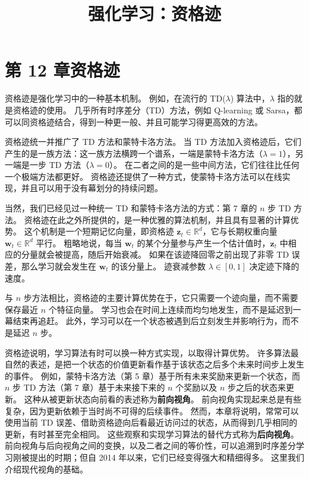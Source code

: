 \documentclass[UTF8,12pt,a4paper,fontset=fandol]{ctexart}
\title{强化学习：资格迹}
\author{}
\date{}
\begin{document}
\maketitle

\section*{第 12 章\quad 资格迹}

资格迹是强化学习中的一种基本机制。
例如，在流行的 TD($\lambda$) 算法中，$\lambda$ 指的就是资格迹的使用。
几乎所有时序差分（TD）方法，例如 Q-learning 或 Sarsa，都可以同资格迹结合，得到一种更一般、并且可能学习得更高效的方法。

资格迹统一并推广了 TD 方法和蒙特卡洛方法。
当 TD 方法加入资格迹后，它们产生的是一族方法：这一族方法横跨一个谱系，一端是蒙特卡洛方法（$\lambda=1$），另一端是一步 TD 方法（$\lambda=0$）。
在二者之间的是一些中间方法，它们往往比任何一个极端方法都更好。
资格迹还提供了一种方式，使蒙特卡洛方法可以在线实现，并且可以用于没有幕划分的持续问题。

当然，我们已经见过一种统一 TD 和蒙特卡洛方法的方式：第 7 章的 $n$ 步 TD 方法。
资格迹在此之外所提供的，是一种优雅的算法机制，并且具有显著的计算优势。
这个机制是一个短期记忆向量，即资格迹 $\mathbf{z}_t\in\mathbb{R}^d$，它与长期权重向量 $\mathbf{w}_t\in\mathbb{R}^d$ 平行。
粗略地说，每当 $\mathbf{w}_t$ 的某个分量参与产生一个估计值时，$\mathbf{z}_t$ 中相应的分量就会被提高，随后开始衰减。
如果在该迹降回零之前出现了非零 TD 误差，那么学习就会发生在 $\mathbf{w}_t$ 的该分量上。
迹衰减参数 $\lambda\in[0,1]$ 决定迹下降的速度。

与 $n$ 步方法相比，资格迹的主要计算优势在于，它只需要一个迹向量，而不需要保存最近 $n$ 个特征向量。
学习也会在时间上连续而均匀地发生，而不是延迟到一幕结束再追赶。
此外，学习可以在一个状态被遇到后立刻发生并影响行为，而不是延迟 $n$ 步。

资格迹说明，学习算法有时可以换一种方式实现，以取得计算优势。
许多算法最自然的表述，是把一个状态的价值更新看作基于该状态之后多个未来时间步上发生的事件。
例如，蒙特卡洛方法（第 5 章）基于所有未来奖励来更新一个状态，而 $n$ 步 TD 方法（第 7 章）基于未来接下来的 $n$ 个奖励以及 $n$ 步之后的状态来更新。
这种从被更新状态向前看的表述称为\textbf{前向视角}。
前向视角实现起来总是有些复杂，因为更新依赖于当时尚不可得的后续事件。
然而，本章将说明，常常可以使用当前 TD 误差、借助资格迹向后看最近访问过的状态，从而得到几乎相同的更新，有时甚至完全相同。
这些观察和实现学习算法的替代方式称为\textbf{后向视角}。
前向视角与后向视角之间的变换，以及二者之间的等价性，可以追溯到时序差分学习刚被提出的时期；但自 2014 年以来，它们已经变得强大和精细得多。
这里我们介绍现代视角的基础。
\end{document}
